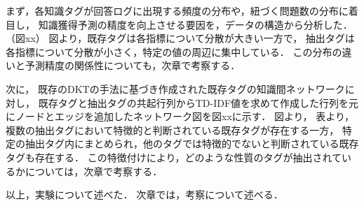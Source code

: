 まず，各知識タグが回答ログに出現する頻度の分布や，紐づく問題数の分布に着目し，
知識獲得予測の精度を向上させる要因を，データの構造から分析した．（図xx）
図より，既存タグは各指標について分散が大きい一方で，
抽出タグは各指標について分散が小さく，特定の値の周辺に集中している．
この分布の違いと予測精度の関係性についても，次章で考察する．

次に，
既存のDKTの手法に基づき作成された既存タグの知識間ネットワークに対し，
既存タグと抽出タグの共起行列からTD-IDF値を求めて作成した行列を元にノードとエッジを追加したネットワーク図を図xxに示す．
図より，
表より，複数の抽出タグにおいて特徴的と判断されている既存タグが存在する一方，
特定の抽出タグ内にまとめられ，他のタグでは特徴的でないと判断されている既存タグも存在する．
この特徴付けにより，どのような性質のタグが抽出されているかについては，次章で考察する．



\vvspace
以上，実験について述べた．
次章では，考察について述べる．



